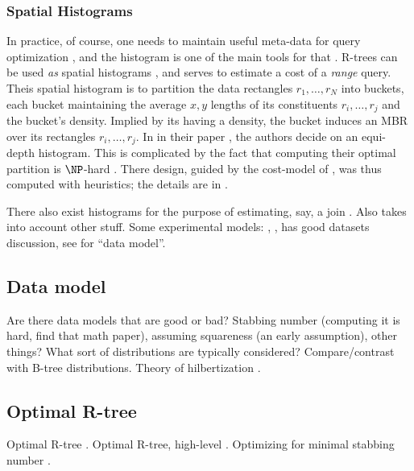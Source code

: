 \subsubsection{Spatial Histograms}
In practice, of course, one needs to maintain useful meta-data for query optimization \cite{chaudhuri98}, and the histogram is one of the main tools for that \cite{poosalahaasioannidisshekita96}.
R-trees can be used \emph{as} spatial histograms \cite{achakeevseeger12}, and serves to estimate a cost of a \emph{range} query.
Theis spatial histogram is to partition the data rectangles $r_1,\ldots,r_N$ into buckets, each bucket maintaining the average $x,y$ lengths of its constituents $r_i,\ldots,r_j$ and the bucket's density.
Implied by its having a density, the bucket induces an MBR over its rectangles $r_i,\ldots,r_j$.
In in their paper \cite{achakeevseeger12}, the authors decide on an equi-depth histogram.
This is complicated by the fact that computing their optimal partition is $\NP$-hard \cite{muthukrishnanpoosalasuel99}.
There design, guided by the cost-model of \cite{theodoridissellis96}, was thus computed with heuristics; the details are in \cite{achakeevseeger12a}.

There also exist histograms for the purpose of estimating, say, a join \cite{aboulnaganaughton00}.
Also takes into account other stuff.
Some experimental models: \cite{aboulnaganaughton00}, \cite{anyangsivasubramaniam01}, \cite{achakeevseeger12,achakeevseeger12a} has good datasets discussion, see for ``data model''.

\subsection{Data model}
Are there data models that are good or bad? Stabbing number (computing it is hard, find that math paper), assuming squareness (an early assumption), other things?
What sort of distributions are typically considered?
Compare/contrast with B-tree distributions.
Theory of hilbertization \cite{haverkortwalderveen11}.

\subsection{Optimal R-tree}
Optimal R-tree \cite{argeberghaverkortyi04}.
Optimal R-tree, high-level \cite{yi12}.
Optimizing for minimal stabbing number \cite{bergkhosraviverdonschotweele11}.
